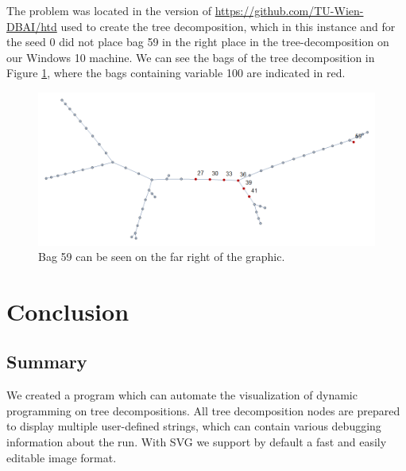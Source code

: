 \documentclass[a4paper, 12pt, bibliography=totoc]{scrartcl}
\begin{document}

The problem was located in the version of \url{https://github.com/TU-Wien-DBAI/htd} used to create the tree decomposition, which in this instance and for the seed $0$ did not place bag 59 in the right place in the tree-decomposition on our Windows 10 machine. We can see the bags of the tree decomposition in Figure \ref{fig:bag59td}, where the bags containing variable 100 are indicated in red. 

\begin{figure}
	\centering
	\includegraphics[width=0.9\linewidth,height=0.9\textheight,keepaspectratio]{images/stars100var100.png}
	\caption{Bag 59 can be seen on the far right of the graphic.}
	\label{fig:bag59td}
\end{figure}
\newpage
\section{Conclusion}\label{sec:conclusion}
\subsection{Summary}
We created a program which can automate the visualization of dynamic programming on tree decompositions. All tree decomposition nodes are prepared to display multiple user-defined strings, which can contain various debugging information about the run.
With SVG we support by default a fast and easily editable image format.\\
\end{document}
